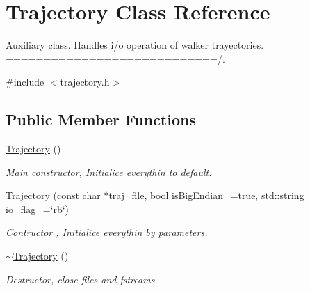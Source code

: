 \hypertarget{class_trajectory}{}\section{Trajectory Class Reference}
\label{class_trajectory}


Auxiliary class. Handles i/o operation of walker trayectories. ============================/.  




{\ttfamily \#include $<$trajectory.\+h$>$}

\subsection*{Public Member Functions}
\begin{DoxyCompactItemize}
\item 
\mbox{\label{class_trajectory_aa340ba80f1f4d1aa39f19f069d5d8089}} 
\hyperlink{class_trajectory_aa340ba80f1f4d1aa39f19f069d5d8089}{Trajectory} ()
\begin{DoxyCompactList}\small\item\em Main constructor, Initialice everythin to default. \end{DoxyCompactList}\item 
\mbox{\label{class_trajectory_a4879a4d0944eb04246e21deac940b90d}} 
\hyperlink{class_trajectory_a4879a4d0944eb04246e21deac940b90d}{Trajectory} (const char $\ast$traj\+\_\+file, bool is\+Big\+Endian\+\_\+=true, std\+::string io\+\_\+flag\+\_\+=\char`\"{}rb\char`\"{})
\begin{DoxyCompactList}\small\item\em Contructor , Initialice everythin by parameters. \end{DoxyCompactList}\item 
\mbox{\label{class_trajectory_ac673c37025ca5353ad99ab41c936e75d}} 
\hyperlink{class_trajectory_ac673c37025ca5353ad99ab41c936e75d}{$\sim$\+Trajectory} ()
\begin{DoxyCompactList}\small\item\em Destructor, close files and fstreams. \end{DoxyCompactList}\item 
\mbox{\label{class_trajectory_aaeda8b05ad61298fbd2aba2a3192486e}} 

\end{DoxyCompactItemize}
